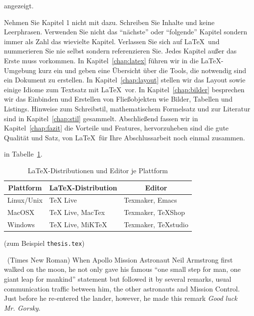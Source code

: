 \documentclass[11pt,a4paper]{report}
\begin{document}
 angezeigt. 


Nehmen Sie Kapitel 1 nicht mit dazu. Schreiben Sie Inhalte und keine
Leerphrasen. Verwenden Sie nicht das "`nächste"' oder "`folgende"' Kapitel
sondern immer als Zahl das wievielte Kapitel. 
Verlassen Sie sich auf \LaTeX\ und nummerieren Sie nie selbst sondern
referenzieren Sie. Jedes Kapitel außer das Erste muss vorkommen. 
In Kapitel~\ref{chap:latex} führen wir in die \LaTeX-Umgebung kurz ein und 
geben eine Übersicht über die Tools, die notwendig sind ein Dokument zu 
erstellen.
In Kapitel~\ref{chap:layout} stellen wir das Layout sowie einige Idiome 
zum Textsatz mit \LaTeX\ vor. 
In Kapitel~\ref{chap:bilder} besprechen wir das Einbinden und Erstellen 
von Fließobjekten wie Bilder, Tabellen und Listings.
Hinweise zum Schreibstil, mathematischem Formelsatz und zur Literatur sind 
in Kapitel~\ref{chap:stil} gesammelt.
Abschließend fassen wir in Kapitel~\ref{chap:fazit} die Vorteile und Features,
hervorzuheben sind die gute Qualität und Satz,
von \LaTeX\ für Ihre Abschlussarbeit noch einmal zusammen.


in Tabelle~\ref{tab:disteditplattform}.
\begin{table}
\centering
\begin{tabular}{|l||l|l|}
\hline
\multicolumn{1}{|c|}{\textbf{Plattform}} & 
\multicolumn{1}{|c|}{\textbf{\LaTeX-Distribution}} & 
\multicolumn{1}{|c|}{\textbf{Editor}} \\\hline\hline
Linux/Unix & TeX Live         & Texmaker, Emacs \\\hline
MacOSX     & TeX Live, MacTex & Texmaker, TeXShop \\\hline
Windows    & TeX Live, MiKTeX & Texmaker, TeXstudio \\\hline   
\end{tabular}
\caption{\LaTeX-Distributionen und Editor je Plattform}
\label{tab:disteditplattform}
\end{table}

(zum Beispiel \verb|thesis.tex|)



\noindent\parbox[t]{\textwidth}{
\fontsize{11}{13pt}\selectfont \ 
(Times New Roman) When Apollo Mission Astronaut Neil Armstrong first 
walked on the moon, he not only gave his famous ``one small step 
for man, one giant leap for mankind'' statement but followed it by 
several remarks, usual communication traffic between him, the other
astronauts and Mission Control. 
Just before he re-entered the lander, however, he made this 
remark \textit{Good luck Mr. Gorsky}.
}
\end{document}
